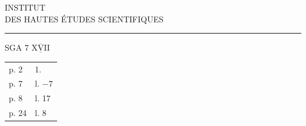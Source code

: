 \begin{center}
INSTITUT\\
DES HAUTES ÉTUDES SCIENTIFIQUES\\[-.3ex]
\rule{1.3cm}{.4pt}
\end{center}

SGA 7 $\underline{\overline{\mathrm{XVII}}}$

\begin{tabular}{@{}ll@{}}
p. 2 & 1.\\
p. 7 & l. $-7$\\
p. 8 & l. 17\\
p. 24 & l. 8
\end{tabular}

